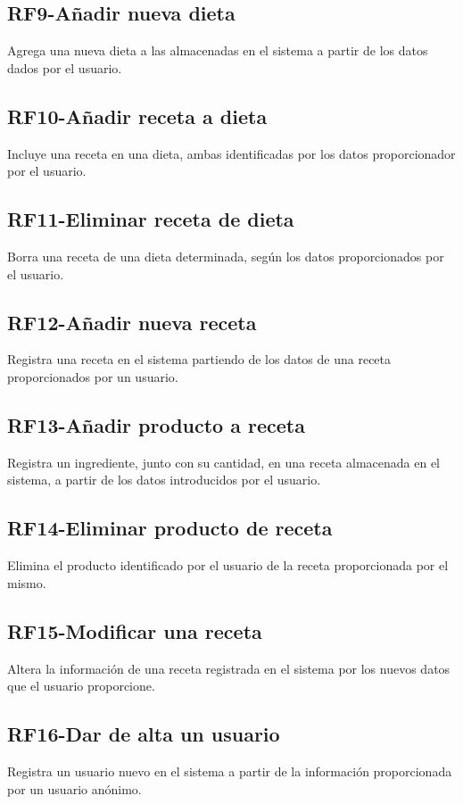 \documentclass[a4paper,12pt]{report}
\begin{document}
\subsection{\textbf{RF9-Añadir nueva dieta}}
\label{sec-2-2-9}
Agrega una nueva dieta a las almacenadas en el sistema a partir de los datos dados por el usuario.
\subsection{\textbf{RF10-Añadir receta a dieta}}
\label{sec-2-2-10}
Incluye una receta en una dieta, ambas identificadas por los datos proporcionador por el usuario.
\subsection{\textbf{RF11-Eliminar receta de dieta}}
\label{sec-2-2-11}
Borra una receta de una dieta determinada, según los datos proporcionados por el usuario.
\subsection{\textbf{RF12-Añadir nueva receta}}
\label{sec-2-2-12}
Registra una receta en el sistema partiendo de los datos de una receta proporcionados por un usuario.
\subsection{\textbf{RF13-Añadir producto a receta}}
\label{sec-2-2-13}
Registra un ingrediente, junto con su cantidad, en una receta almacenada en el sistema, a partir de los datos introducidos por el usuario.
\subsection{\textbf{RF14-Eliminar producto de receta}}
\label{sec-2-2-14}
Elimina el producto identificado por el usuario de la receta proporcionada por el mismo.
\subsection{\textbf{RF15-Modificar una receta}}
\label{sec-2-2-15}
Altera la información de una receta registrada en el sistema por los nuevos datos que el usuario proporcione.
\subsection{\textbf{RF16-Dar de alta un usuario}}
\label{sec-2-2-16}
Registra un usuario nuevo en el sistema a partir de la información proporcionada por un usuario anónimo.
\end{document}
